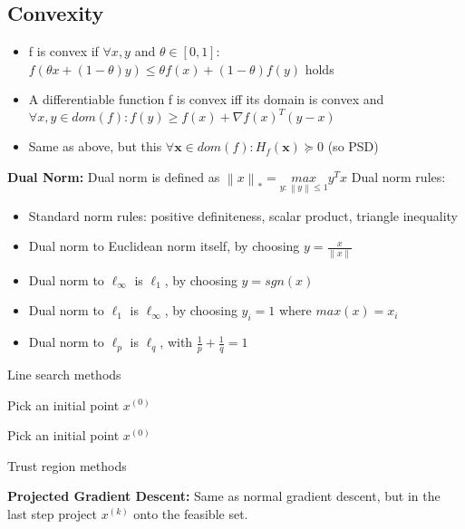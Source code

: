 \documentclass[a4paper]{article}
\begin{document}
\subsection{Convexity}
\begin{itemize}
    \item f is convex if $\forall x,y$ and $\theta \in [0,1]$: $f(\theta x + (1-\theta)y ) \leq \theta f(x) + (1-\theta)f(y)$ holds 
    \item A differentiable function f is convex iff its domain is convex and $\forall x,y\in dom(f): f(y) \geq f(x) + \nabla f(x)^T (y-x)$ 
    \item Same as above, but this $\forall \mathbf{x}\in dom(f) : H_f(\mathbf{x}) \succeq 0$ (so PSD)  

\end{itemize}
  

\textbf{Dual Norm:}
Dual norm is defined as $\left\lVert x\right\rVert_* = \underset{y: \left\lVert y\right\rVert \leq 1}{max}y^Tx $ 
Dual norm rules:
\begin{itemize}
    \item Standard norm rules: positive definiteness, scalar product, triangle inequality
    \item Dual norm to Euclidean norm itself, by choosing $y= \frac{x}{\left\lVert x\right\rVert }$ 
    \item Dual norm to $\ell_\infty$ is $\ell_1$, by choosing $y= sgn(x)$
    \item Dual norm to $\ell_1$ is $\ell_\infty$, by choosing $y_i = 1$ where $max(x) = x_i$
    \item Dual norm to $\ell_p $ is $\ell_q$, with $\frac{1}{p} + \frac{1}{q} = 1$           
\end{itemize}
\begin{algorithm}
    \caption{Line search methods}
    Pick an initial point $x^{(0)}$\\
\end{algorithm}

\begin{algorithm}
    Pick an initial point $x^{(0)}$ \\
    \caption{Trust region methods}
\end{algorithm}

\textbf{Projected Gradient Descent:} 
\newline
Same as normal gradient descent, but in the last step project $x^{(k)}$ onto the feasible set. 
\end{document}
